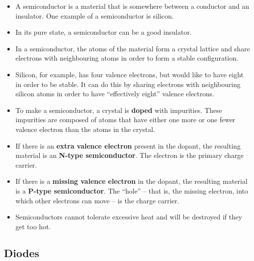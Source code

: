 \documentclass[letterpaper,12pt]{scrartcl}
\begin{document}
\begin{itemize}
\item A semiconductor is a material that is somewhere between a conductor and an insulator. One example of a semiconductor is silicon.
\item In its pure state, a semiconductor can be a good insulator.
\item In a semiconductor, the atoms of the material form a crystal lattice and share electrons with neighbouring atoms in order to form a stable configuration.
\item Silicon, for example, has four valence electrons, but would like to have eight in order to be stable. It can do this by sharing electrons with neighbouring silicon atoms
in order to have ``effectively eight'' valence electrons.
\item To make a semiconductor, a crystal is \textbf{doped} with impurities. These impurities are composed of atoms that have either one more or one fewer valence electron than the atoms in the crystal.
\item If there is an \textbf{extra valence electron} present in the dopant, the resulting material is an \textbf{N-type semiconductor}. The electron is the primary charge carrier.
\item If there is a \textbf{missing valence electron} in the dopant, the resulting material is a \textbf{P-type semiconductor}. The ``hole'' -- that is, the missing electron, into which other electrons can move --
is the charge carrier.
\item Semiconductors cannot tolerate excessive heat and will be destroyed if they get too hot.
\end{itemize}

\subsection{Diodes}
\end{document}
